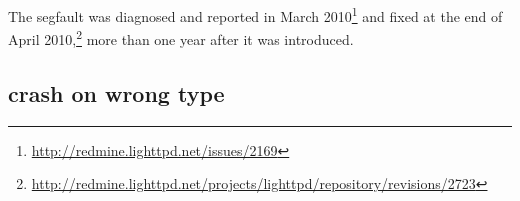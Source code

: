 The segfault was diagnosed and reported in March
2010\footnote{\url{http://redmine.lighttpd.net/issues/2169}} and fixed
at the end of April
2010,\footnote{\url{http://redmine.lighttpd.net/projects/lighttpd/repository/revisions/2723}}
more than one year after it was introduced.  



\subsection{\redis crash on wrong  type}

